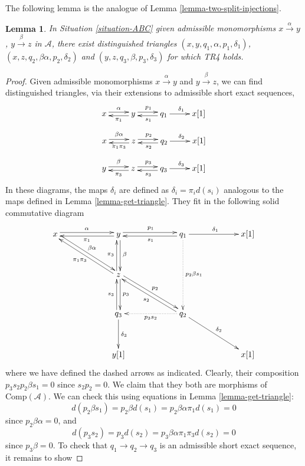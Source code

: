 \documentclass{stacks-project}
\theoremstyle{plain}
\newtheorem{lemma}[subsection]{Lemma}
\theoremstyle{definition}
\theoremstyle{remark}
\numberwithin{equation}{subsection}
\begin{document}
\noindent
The following lemma is the analogue of Lemma \ref{lemma-two-split-injections}.

\begin{lemma}
\label{lemma-dgc-analogue-tr4}
In Situation \ref{situation-ABC} given admissible monomorphisms
$x \xrightarrow{\alpha} y$, $y \xrightarrow{\beta} z$ in $\mathcal{A}$,
there exist distinguished triangles
$(x,y,q_1,\alpha,p_1,\delta_1)$, $(x,z,q_2,\beta\alpha,p_2,\delta_2)$
and $(y,z,q_3,\beta,p_3,\delta_3)$ for which TR4 holds.
\end{lemma}

\begin{proof}
Given admissible monomorphisms $x\xrightarrow{\alpha} y$ and
$y\xrightarrow{\beta}z$, we can find distinguished triangles,
via their extensions to admissible short exact sequences,
$$
\xymatrix{
x\ar@<0.5ex>[r]^{\alpha} &
y\ar@<0.5ex>[l]^{\pi_1} \ar@<0.5ex>[r]^{p_1} &
q_1 \ar[r]^{\delta_1} \ar@<0.5ex>[l]^{s_1} &
x[1]
}
$$
$$
\xymatrix{
x\ar@<0.5ex>[r]^{\beta\alpha} &
z\ar@<0.5ex>[l]^{\pi_1\pi_3} \ar@<0.5ex>[r]^{p_2} &
q_2 \ar[r]^{\delta_2} \ar@<0.5ex>[l]^{s_2} &
x[1]
}
$$
$$
\xymatrix{
y\ar@<0.5ex>[r]^{\beta} &
z\ar@<0.5ex>[l]^{\pi_3} \ar@<0.5ex>[r]^{p_3} &
q_3 \ar[r]^{\delta_3} \ar@<0.5ex>[l]^{s_3} &
x[1]
}
$$
In these diagrams, the maps $\delta_i$ are defined as
$\delta_i = \pi_i d(s_i)$ analogous to the maps defined in
Lemma \ref{lemma-get-triangle}.
They fit in the following solid commutative diagram
$$
\xymatrix@C=5pc@R=3pc{
x\ar@<0.5ex>[r]^{\alpha} \ar@<0.5ex>[dr]^{\beta\alpha} &
y\ar@<0.5ex>[d]^{\beta} \ar@<0.5ex>[l]^{\pi_1} \ar@<0.5ex>[r]^{p_1} &
q_1 \ar[r]^{\delta_1} \ar@<0.5ex>[l]^{s_1} \ar@{.>}[dd]^{p_2\beta s_1} &
x[1] \\
 &
z \ar@<0.5ex>[u]^{\pi_3}\ar@<0.5ex>[d]^{p_3}
\ar@<0.5ex>[dr]^{p_2} \ar@<0.5ex>[ul]^{\pi_1\pi_3} & & \\
 &
q_3\ar@<0.5ex>[u]^{s_3} \ar[d]^{\delta_3} &
q_2 \ar@{.>}[l]^{p_3s_2} \ar@<0.5ex>[ul]^{s_2} \ar[dr]^{\delta_2} \\
 &
y[1] & & x[1]}
$$
where we have defined the dashed arrows as indicated.
Clearly, their composition $p_3s_2p_2\beta s_1 = 0$
since $s_2p_2 = 0$. We claim that they both are morphisms of
$\text{Comp}(\mathcal{A})$. We can check this using equations in
Lemma \ref{lemma-get-triangle}:
$$
d(p_2\beta s_1) = p_2\beta d(s_1) = p_2\beta\alpha\pi_1 d(s_1) = 0
$$
since $p_2\beta\alpha = 0$, and
$$
d(p_3s_2) = p_3d(s_2) = p_3\beta\alpha\pi_1\pi_3 d(s_2) = 0
$$
since $p_3\beta = 0$. To check that $q_1\to q_2\to q_3$
is an admissible short exact sequence, it remains to show

\end{proof}
\end{document}
